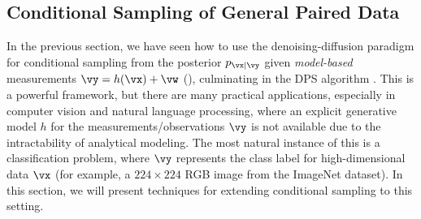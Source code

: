 \documentclass[../../book-main.tex]{subfiles}
\begin{document}

\subsection{Conditional Sampling of General Paired Data}\label{sub:cfg}

In the previous section, we have seen how to use the denoising-diffusion
paradigm for conditional sampling from the posterior $p_{\vx \mid \vy}$ given
\textit{model-based} measurements $\vy = h(\vx) + \vw$
(), culminating in the
DPS algorithm . This is a powerful
framework, but there are many practical applications, especially in computer
vision and natural language processing, where an explicit generative model $h$
for the measurements/observations $\vy$ is not available due to the
intractability of analytical modeling. The most natural instance of this is
a classification problem, where $\vy$ represents the class label for
high-dimensional data $\vx$ (for example, a $224 \times 224$ RGB image from the
ImageNet dataset). In this section, we will present techniques for extending
conditional sampling to this setting.
\end{document}
